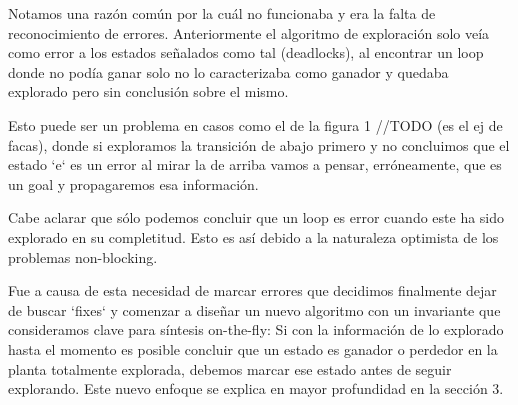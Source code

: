Notamos una razón común por la cuál no funcionaba y era la falta de reconocimiento de errores. Anteriormente el algoritmo de exploración solo veía como error a los estados señalados como tal (deadlocks), al encontrar un loop donde no podía ganar solo no lo caracterizaba como ganador y quedaba explorado pero sin conclusión sobre el mismo.

Esto puede ser un problema en casos como el de la figura 1 //TODO (es el ej de facas), donde si exploramos la transición de abajo primero y no concluimos que el estado `e` es un error al mirar la de arriba vamos a pensar, erróneamente, que es un goal y propagaremos esa información.

Cabe aclarar que sólo podemos concluir que un loop es error cuando este ha sido explorado en su completitud. Esto es así debido a la naturaleza optimista de los problemas non-blocking.

Fue a causa de esta necesidad de marcar errores que decidimos finalmente dejar de buscar `fixes` y comenzar a diseñar un nuevo algoritmo con un invariante que consideramos clave para síntesis on-the-fly: Si con la información de lo explorado hasta el momento es posible concluir que un estado es ganador o perdedor en la planta totalmente explorada, debemos marcar ese estado antes de seguir explorando. Este nuevo enfoque se explica en mayor profundidad en la sección 3.





